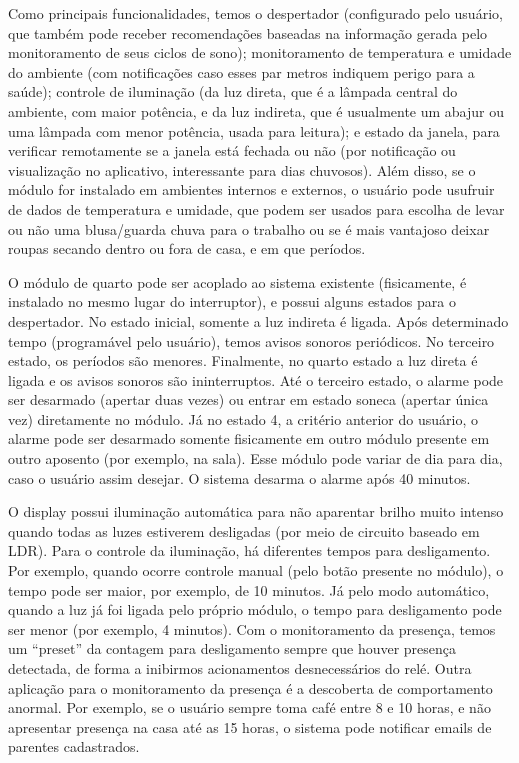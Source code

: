 Como principais funcionalidades, temos o despertador (configurado pelo usuário, que também pode receber recomendações baseadas na informação gerada pelo monitoramento de seus ciclos de sono); monitoramento de temperatura e umidade do ambiente (com notificações caso esses par metros indiquem perigo para a saúde); controle de iluminação (da luz direta, que é a lâmpada central do ambiente, com maior potência, e da luz indireta, que é usualmente um abajur ou uma lâmpada com menor potência, usada para leitura); e estado da janela, para verificar remotamente se a janela está fechada ou não (por notificação ou visualização no aplicativo, interessante para dias chuvosos). Além disso, se o módulo for instalado em ambientes internos e externos, o usuário pode usufruir de dados de temperatura e umidade, que podem ser usados para escolha de levar ou não uma blusa/guarda chuva para o trabalho ou se é mais vantajoso deixar roupas secando dentro ou fora de casa, e em que períodos.

O módulo de quarto pode ser acoplado ao sistema existente (fisicamente, é instalado no mesmo lugar do interruptor), e possui alguns estados para o despertador. No estado inicial, somente a luz indireta é ligada. Após determinado tempo (programável pelo usuário), temos avisos sonoros periódicos. No terceiro estado, os períodos são menores. Finalmente, no quarto estado a luz direta é ligada e os avisos sonoros são ininterruptos. Até o terceiro estado, o alarme pode ser desarmado (apertar duas vezes) ou entrar em estado soneca (apertar única vez) diretamente no módulo. Já no estado 4, a critério anterior do usuário, o alarme pode ser desarmado somente fisicamente em outro módulo presente em outro aposento (por exemplo, na sala). Esse módulo pode variar de dia para dia, caso o usuário assim desejar. O sistema desarma o alarme após 40 minutos.

O display possui iluminação automática para não aparentar brilho muito intenso quando todas as luzes estiverem desligadas (por meio de circuito baseado em LDR). Para o controle da iluminação, há diferentes tempos para desligamento. Por exemplo, quando ocorre controle manual (pelo botão presente no módulo), o tempo pode ser maior, por exemplo, de 10 minutos. Já pelo modo automático, quando a luz já foi ligada pelo próprio módulo, o tempo para desligamento pode ser menor (por exemplo, 4 minutos). Com o monitoramento da presença, temos um “preset” da contagem para desligamento sempre que houver presença detectada, de forma a inibirmos acionamentos desnecessários do relé. Outra aplicação para o monitoramento da presença é a descoberta de comportamento anormal. Por exemplo, se o usuário sempre toma café entre 8 e 10 horas, e não apresentar presença na casa até as 15 horas, o sistema pode notificar emails de parentes cadastrados.

